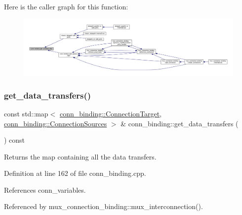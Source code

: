 Here is the caller graph for this function\+:
\nopagebreak
\begin{figure}[H]
\begin{center}
\leavevmode
\includegraphics[width=350pt]{d2/db1/classconn__binding_a46ef802caccfc0f0fb9625b0ba99e5eb_icgraph}
\end{center}
\end{figure}
\mbox{\label{classconn__binding_a3d80a579f44ae487ed5419b560ad5d26}} 
\subsubsection{\texorpdfstring{get\+\_\+data\+\_\+transfers()}{get\_data\_transfers()}}
{\footnotesize\ttfamily const std\+::map$<$ \hyperlink{structconn__binding_1_1ConnectionTarget}{conn\+\_\+binding\+::\+Connection\+Target}, \hyperlink{classconn__binding_aa5406c3bf4cee893234c2b0847471f56}{conn\+\_\+binding\+::\+Connection\+Sources} $>$ \& conn\+\_\+binding\+::get\+\_\+data\+\_\+transfers (\begin{DoxyParamCaption}{ }\end{DoxyParamCaption}) const}



Returns the map containing all the data transfers. 



Definition at line 162 of file conn\+\_\+binding.\+cpp.



References conn\+\_\+variables.



Referenced by mux\+\_\+connection\+\_\+binding\+::mux\+\_\+interconnection().

